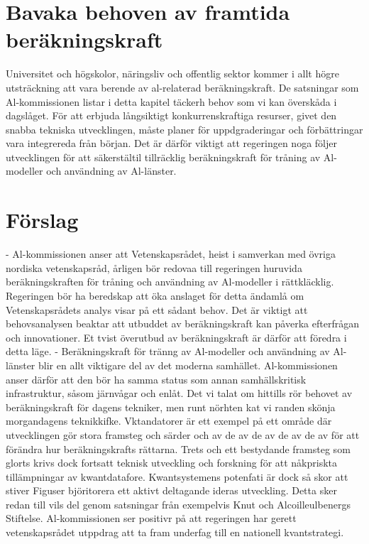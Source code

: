 {{{{\section*{Bavaka behoven av framtida beräkningskraft}
Universitet och högskolor, näringsliv och offentlig sektor kommer i allt högre utsträckning att vara berende av al-relaterad beräkningskraft. De satsningar som Al-kommissionen listar i detta kapitel täckerh behov som vi kan överskåda i dagslåget. För att erbjuda långsiktigt konkurrenskraftiga resurser, givet den snabba tekniska utvecklingen, måste planer för uppdgraderingar och förbättringar vara integrereda från början. Det är därför viktigt att regeringen noga följer utvecklingen för att säkerstältil tillräcklig beräkningskraft för tråning av Al-modeller och användning av Al-länster.
\section*{Förslag}
- Al-kommissionen anser att Vetenskapsrådet, heist i samverkan med övriga nordiska vetenskapsråd, årligen bör redovaa till regeringen huruvida beräkningskraften för tråning och användning av Al-modeller i rättkläcklig.
Regeringen bör ha beredskap att öka anslaget för detta ändamlå om Vetenskapsrådets analys visar på ett sådant behov. Det är viktigt att behovsanalysen beaktar att utbuddet av beräkningskraft kan påverka efterfrågan och innovationer. Et tvist överutbud av beräkningskraft är därför att föredra i detta läge.
- Beräkningskraft för tränng av Al-modeller och användning av Al-länster blir en allt viktigare del av det moderna samhället. Al-kommissionen anser därför att den bör ha samma status som annan samhällskritisk infrastruktur, såsom järnvågar och enlåt.
Det vi talat om hittills rör behovet av beräkningskraft för dagens tekniker, men runt nörhten kat vi randen skönja morgandagens teknikkifke. Vktandatorer är ett exempel på ett område där utvecklingen gör stora framsteg och särder och av de av de av de av de av för att förändra hur beräkningskrafts rättarna. Trets och ett bestydande framsteg som glorts krivs dock fortsatt teknisk utveckling och forskning för att nåkpriskta tillämpningar av kwantdatafore. Kwantsystemens potenfati är dock så skor att stiver Figuser björitorera ett aktivt deltagande ideras utveckling. Detta sker redan till vils del genom satsningar från exempelvis Knut och Alcoilleulbenergs Stiftelse. Al-kommissionen ser positivr på att regeringen har gerett vetenskapsrådet utppdrag att ta fram underfag till en nationell kvantstrategi. \({ }^{}\)

}}}}
